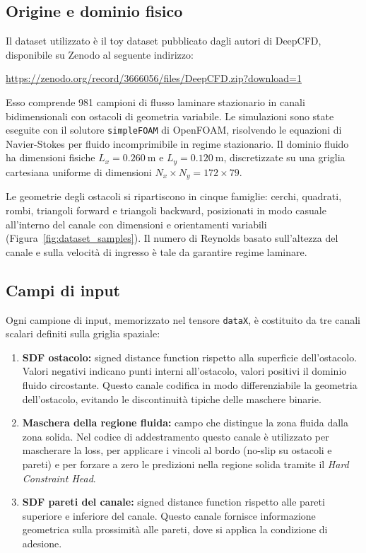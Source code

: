 \documentclass[final,3p,times]{elsarticle}
\begin{document}
\subsection{Origine e dominio fisico}
Il dataset utilizzato \`e il toy dataset pubblicato dagli autori di DeepCFD, disponibile su Zenodo al seguente indirizzo:
\begin{center}
\url{https://zenodo.org/record/3666056/files/DeepCFD.zip?download=1}
\end{center}
Esso comprende 981 campioni di flusso laminare stazionario in canali bidimensionali con ostacoli di geometria variabile. Le simulazioni sono state eseguite con il solutore \texttt{simpleFOAM} di OpenFOAM, risolvendo le equazioni di Navier-Stokes per fluido incomprimibile in regime stazionario. Il dominio fluido ha dimensioni fisiche $L_x = \SI{0.260}{\meter}$ e $L_y = \SI{0.120}{\meter}$, discretizzate su una griglia cartesiana uniforme di dimensioni $N_x \times N_y = 172 \times 79$.

Le geometrie degli ostacoli si ripartiscono in cinque famiglie: cerchi, quadrati, rombi, triangoli forward e triangoli backward, posizionati in modo casuale all'interno del canale con dimensioni e orientamenti variabili (Figura~\ref{fig:dataset_samples}). Il numero di Reynolds basato sull'altezza del canale e sulla velocit\`a di ingresso \`e tale da garantire regime laminare.

\subsection{Campi di input}\label{subsec:input}
Ogni campione di input, memorizzato nel tensore \texttt{dataX}, \`e costituito da tre canali scalari definiti sulla griglia spaziale:
\begin{enumerate}
    \item \textbf{SDF ostacolo:} signed distance function rispetto alla superficie dell'ostacolo. Valori negativi indicano punti interni all'ostacolo, valori positivi il dominio fluido circostante. Questo canale codifica in modo differenziabile la geometria dell'ostacolo, evitando le discontinuit\`a tipiche delle maschere binarie.
    \item \textbf{Maschera della regione fluida:} campo che distingue la zona fluida dalla zona solida. Nel codice di addestramento questo canale \`e utilizzato per mascherare la loss, per applicare i vincoli al bordo (no-slip su ostacoli e pareti) e per forzare a zero le predizioni nella regione solida tramite il \emph{Hard Constraint Head}.
    \item \textbf{SDF pareti del canale:} signed distance function rispetto alle pareti superiore e inferiore del canale. Questo canale fornisce informazione geometrica sulla prossimit\`a alle pareti, dove si applica la condizione di adesione.
\end{enumerate}
\end{document}
